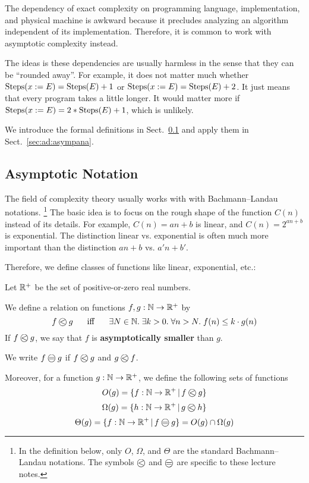 The dependency of exact complexity on programming language, implementation, and physical machine is awkward because it precludes analyzing an algorithm independent of its implementation.
Therefore, it is common to work with asymptotic complexity instead.

The ideas is these dependencies are usually harmless in the sense that they can be ``rounded away''.
For example, it does not matter much whether $\mathrm{Steps}(x:=E)=\mathrm{Steps}(E)+1$ or $\mathrm{Steps}(x:=E)=\mathrm{Steps}(E)+2$.
It just means that every program takes a little longer.
It would matter more if $\mathrm{Steps}(x:=E)=2*\mathrm{Steps}(E)+1$, which is unlikely.

We introduce the formal definitions in Sect.~\ref{sec:ad:onot} and apply them in Sect.~\ref{sec:ad:asympana}.

\subsection{Asymptotic Notation}\label{sec:ad:onot}

The field of complexity theory usually works with with Bachmann–Landau notations.%
\footnote{In the definition below, only $O$, $\Omega$, and $\Theta$ are the standard Bachmann–Landau notations. The symbols $\Oleq{}{}$ and $\Oeq{}{}$ are specific to these lecture notes.}
The basic idea is to focus on the rough shape of the function $C(n)$ instead of its details.
For example, $C(n)=an+b$ is linear, and $C(n)=2^{an+b}$ is exponential.
The distinction linear vs. exponential is often much more important than the distinction $an+b$ vs. $a'n+b'$. 

Therefore, we define classes of functions like linear, exponential, etc.:

\begin{definition}[O-Notation]\label{def:ad:onot}
Let $\mathbb{R}^+$ be the set of positive-or-zero real numbers.

We define a relation on functions $f,g:\mathbb{N}\to\mathbb{R}^+$ by
\[\Oleq{f}{g} \tb\miff\tb \exists N\in\N.\;\exists k>0.\;  \forall n>N.\; f(n)\leq k\cdot g(n)\]
If $\Oleq{f}{g}$, we say that $f$ is \textbf{asymptotically smaller} than $g$.

We write $\Oeq{f}{g}$ if $\Oleq{f}{g}$ and $\Oleq{g}{f}$.

Moreover, for a function $g:\mathbb{N}\to\mathbb{R}^+$, we define the following sets of functions
\[O(g) = \{f:\N\to\R^+\,|\, \Oleq{f}{g}\}\]
\[\Omega(g) = \{h:\N\to\R^+\,|\, \Oleq{g}{h}\}\]
\[\Theta(g) = \{f:\N\to\R^+\,|\, \Oeq{f}{g} \} = O(g)\cap\Omega(g)\]
\end{definition}

